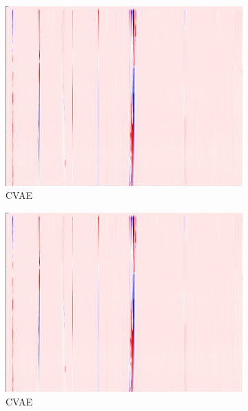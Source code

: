\begin{figure}[!h]
    \begin{subfigure}{0.33\textwidth}
        \includegraphics[width=\textwidth]{figures/test.png}
        \caption{CVAE}
    \end{subfigure}%
    \hfill
    \begin{subfigure}{0.33\textwidth}
        \includegraphics[width=\textwidth]{figures/test.png}
        \caption{CVAE}
    \end{subfigure}%
    \hfill
    \begin{subfigure}{0.33\textwidth}

\end{subfigure}
\end{figure}
